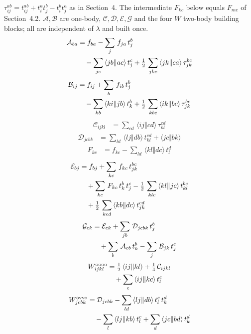 \documentclass[11pt]{article}
\newcommand{\anti}[4]{\langle #1#2\Vert #3#4\rangle}
\begin{document}
$\tau_{ij}^{ab}=t_{ij}^{ab}+t_i^at_j^b-t_i^bt_j^a$ as in Section~4. The intermediate $F_{kc}$ below equals $F_{me}$ of
Section~4.2. $\mathcal A,\mathcal B$ are one-body, $\mathcal C,\mathcal D,\mathcal E,\mathcal G$ and the four $W$ two-body
building blocks; all are independent of $\lambda$ and built once.
\begin{align*}
  \mathcal A_{ba} &=  f_{ba} -  \sum_{j}\,f_{ja}\,t_{j}^{b} \notag\\
  & \quad -  \sum_{jc}\,\anti{j}{b}{a}{c}\,t_{j}^{c} + \tfrac{1}{2}\, \sum_{jkc}\,\anti{j}{k}{c}{a}\,\tau_{jk}^{bc}
\end{align*}
\begin{align*}
  \mathcal B_{ij} &=  f_{ij} +  \sum_{b}\,f_{ib}\,t_{j}^{b} \notag\\
  & \quad -  \sum_{kb}\,\anti{k}{i}{j}{b}\,t_{k}^{b} + \tfrac{1}{2}\, \sum_{kbc}\,\anti{i}{k}{b}{c}\,\tau_{jk}^{bc}
\end{align*}
\begin{align*}
  \mathcal C_{ijkl} &=  \sum_{cd}\,\anti{i}{j}{c}{d}\,\tau_{kl}^{cd}
\end{align*}
\begin{align*}
  \mathcal D_{jcbk} &=  \sum_{ld}\,\anti{l}{j}{d}{b}\,t_{kl}^{cd} +  \anti{j}{c}{b}{k}
\end{align*}
\begin{align*}
  F_{kc} &=  f_{kc} -  \sum_{ld}\,\anti{k}{l}{d}{c}\,t_{l}^{d}
\end{align*}
\begin{align*}
  \mathcal E_{bj} &=  f_{bj} +  \sum_{kc}\,f_{kc}\,t_{jk}^{bc} \notag\\
  & \quad +  \sum_{kc}\,F_{kc}\,t_{k}^{b}\,t_{j}^{c} - \tfrac{1}{2}\, \sum_{klc}\,\anti{k}{l}{j}{c}\,t_{kl}^{bc} \notag\\
  & \quad + \tfrac{1}{2}\, \sum_{kcd}\,\anti{k}{b}{d}{c}\,t_{jk}^{cd}
\end{align*}
\begin{align*}
  \mathcal G_{ck} &=  \mathcal E_{ck} +  \sum_{jb}\,\mathcal D_{jcbk}\,t_{j}^{b} \notag\\
  & \quad +  \sum_{b}\,\mathcal A_{cb}\,t_{k}^{b} -  \sum_{j}\,\mathcal B_{jk}\,t_{j}^{c}
\end{align*}
\begin{align*}
  W^{\rm oooo}_{ijkl} &= \tfrac{1}{2}\, \anti{i}{j}{k}{l} + \tfrac{1}{4}\, \mathcal C_{ijkl} \notag\\
  & \quad +  \sum_{c}\,\anti{i}{j}{k}{c}\,t_{l}^{c}
\end{align*}
\begin{align*}
  W^{\rm ovvo}_{jcbk} &=  \mathcal D_{jcbk} -  \sum_{ld}\,\anti{l}{j}{d}{b}\,t_{l}^{c}\,t_{k}^{d} \notag\\
  & \quad -  \sum_{l}\,\anti{l}{j}{k}{b}\,t_{l}^{c} +  \sum_{d}\,\anti{j}{c}{b}{d}\,t_{k}^{d}
\end{align*}
\end{document}
